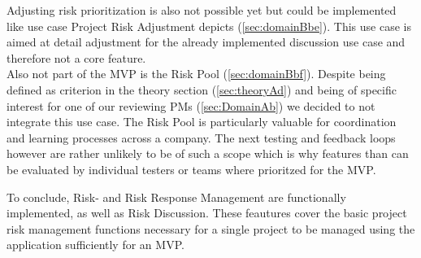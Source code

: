  Adjusting risk prioritization is also not possible yet but could be implemented like use case Project Risk Adjustment depicts (\ref{sec:domainBbe}). This use case is aimed at detail adjustment for the already implemented discussion use case and therefore not a core feature.\\
 Also not part of the MVP is the Risk Pool (\ref{sec:domainBbf}). Despite being defined as criterion in the theory section (\ref{sec:theoryAd}) and being of specific interest for one of our reviewing PMs  (\ref{sec:DomainAb}) we decided to not integrate this use case. The Risk Pool is particularly valuable for coordination and learning processes across a company. The next testing and feedback loops however are rather unlikely to be of such a scope which is why features than can be evaluated by individual testers or teams where prioritzed for the \ac{MVP}.
 
 To conclude, Risk- and Risk Response Management are functionally implemented, as well as Risk Discussion. These feautures cover the basic project risk management functions necessary for a single project to be managed using the application sufficiently for an \ac{MVP}.
 